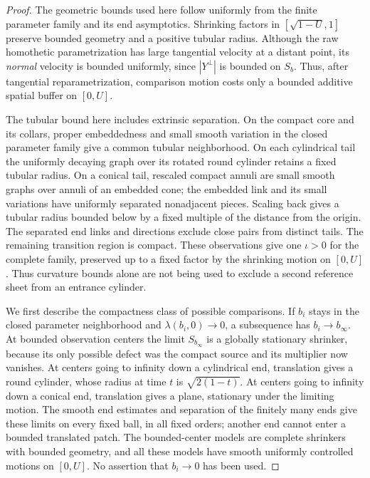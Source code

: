 \begin{proof}
The geometric bounds used here follow uniformly from the finite
parameter family and its end asymptotics.  Shrinking factors in
$[\sqrt{1-U},1]$ preserve bounded geometry and a positive tubular
radius.  Although the raw homothetic parametrization has large
tangential velocity at a distant point, its \emph{normal} velocity
is bounded uniformly, since $|Y^\perp|$ is bounded on $S_b$.
Thus, after tangential reparametrization, comparison motion costs
only a bounded additive spatial buffer on $[0,U]$.

The tubular bound here includes extrinsic separation.  On the compact
core and its collars, proper embeddedness and small smooth variation
in the closed parameter family give a common tubular neighborhood.
On each cylindrical tail the uniformly decaying graph over its
rotated round cylinder retains a fixed tubular radius.  On a conical
tail, rescaled compact annuli are small smooth graphs over annuli of
an embedded cone; the embedded link and its small variations have
uniformly separated nonadjacent pieces.  Scaling back gives a tubular
radius bounded below by a fixed multiple of the distance from the
origin.  The separated end links and directions exclude close pairs
from distinct tails.  The remaining transition region is compact.
These observations give one $\iota>0$ for the complete family,
preserved up to a fixed factor by the shrinking motion on $[0,U]$.
Thus curvature bounds alone are not being used to exclude a second
reference sheet from an entrance cylinder.


We first describe the compactness class of possible comparisons.
If $b_i$ stays in the closed parameter neighborhood and
$\lambda(b_i,0)\to0$, a subsequence has $b_i\to b_\infty$.
At bounded observation centers the limit $S_{b_\infty}$ is a
globally stationary shrinker, because its only possible defect
was the compact source and its multiplier now vanishes.  At
centers going to infinity down a cylindrical end, translation
gives a round cylinder, whose radius at time $t$ is
$\sqrt{2(1-t)}$.  At centers going to infinity down a conical
end, translation gives a plane, stationary under the limiting
motion.  The smooth end estimates and separation of the finitely
many ends give these limits on every fixed ball, in all fixed
orders; another end cannot enter a bounded translated patch.
The bounded-center models are complete shrinkers with bounded
geometry, and all these models have smooth uniformly controlled
motions on $[0,U]$.  No assertion that $b_i\to0$ has been used.


\end{proof}
